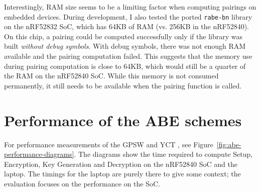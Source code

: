 

Interestingly, RAM size seems to be a limiting factor when computing pairings on embedded devices.
During development, I also tested the ported \texttt{rabe-bn} library on the nRF52832 SoC, which has 64KB of RAM (vs. 256KB in the nRF52840). 
On this chip, a pairing could be computed successfully only if the library was built \emph{without debug symbols}.
With debug symbols, there was not enough RAM available and the pairing computation failed.
This suggests that the memory use during pairing computation is close to 64KB, which would still be a quarter of the RAM on the nRF52840 SoC.
While this memory is not consumed permanently, it still needs to be available when the pairing function is called.

\section{Performance of the ABE schemes}

For performance measurements of the GPSW and YCT , see Figure~\ref{fig:abe-performance-diagrams}. 
The diagrams show the time required to compute Setup, Encryption, Key Generation and Decryption on the nRF52840 SoC and the laptop.
The timings for the laptop are purely there to give some context; the evaluation focuses on the performance on the SoC.

